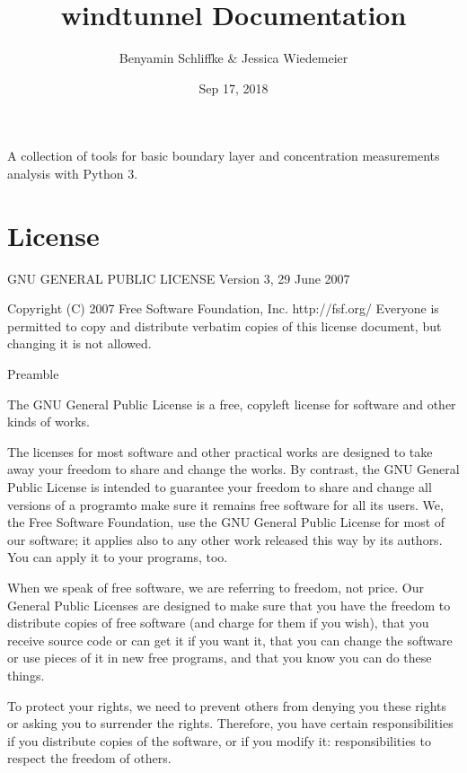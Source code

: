 \documentclass[letterpaper,10pt,english]{sphinxmanual}
\title{windtunnel Documentation}
\date{Sep 17, 2018}
\author{Benyamin Schliffke \& Jessica Wiedemeier}
\begin{document}
\maketitle
\sphinxtableofcontents
{}\label{\detokenize{index::doc}}


A collection of tools for basic boundary layer and concentration measurements analysis with Python 3.


\chapter{License}
\label{\detokenize{license_link:welcome-to-windtunnel-s-documentation}}\label{\detokenize{license_link::doc}}\label{\detokenize{license_link:license}}
%
\begin{sphinxVerbatim}[commandchars=\\\{\}]
                    GNU GENERAL PUBLIC LICENSE
                       Version 3, 29 June 2007

 Copyright (C) 2007 Free Software Foundation, Inc. \PYGZlt{}http://fsf.org/\PYGZgt{}
 Everyone is permitted to copy and distribute verbatim copies
 of this license document, but changing it is not allowed.

                            Preamble

  The GNU General Public License is a free, copyleft license for
software and other kinds of works.

  The licenses for most software and other practical works are designed
to take away your freedom to share and change the works.  By contrast,
the GNU General Public License is intended to guarantee your freedom to
share and change all versions of a program\PYGZhy{}\PYGZhy{}to make sure it remains free
software for all its users.  We, the Free Software Foundation, use the
GNU General Public License for most of our software; it applies also to
any other work released this way by its authors.  You can apply it to
your programs, too.

  When we speak of free software, we are referring to freedom, not
price.  Our General Public Licenses are designed to make sure that you
have the freedom to distribute copies of free software (and charge for
them if you wish), that you receive source code or can get it if you
want it, that you can change the software or use pieces of it in new
free programs, and that you know you can do these things.

  To protect your rights, we need to prevent others from denying you
these rights or asking you to surrender the rights.  Therefore, you have
certain responsibilities if you distribute copies of the software, or if
you modify it: responsibilities to respect the freedom of others.


\end{sphinxVerbatim}
\end{document}
